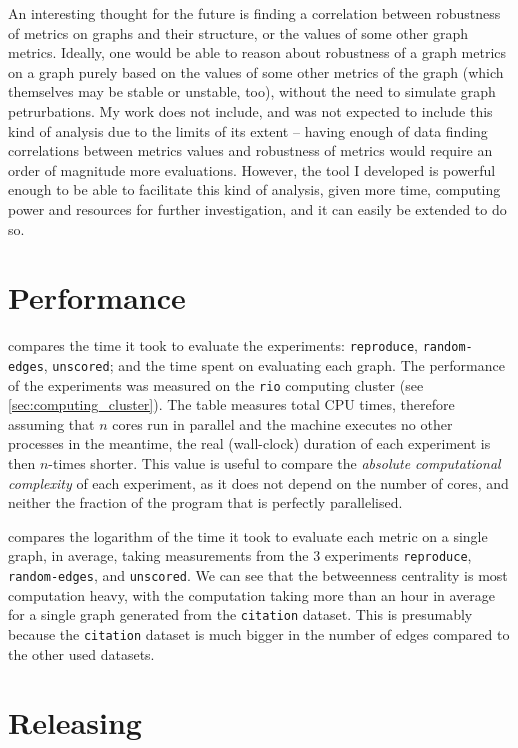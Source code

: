 An interesting thought for the future is finding a correlation between robustness of metrics on graphs and their structure, or the values of some other graph metrics.
Ideally, one would be able to reason about robustness of a graph metrics on a graph purely based on the values of some other metrics of the graph (which themselves may be stable or unstable, too), without the need to simulate graph petrurbations.
My work does not include, and was not expected to include this kind of analysis due to the limits of its extent -- having enough of data finding correlations between metrics values and robustness of metrics would require an order of magnitude more evaluations.
However, the \graffs tool I developed is powerful enough to be able to facilitate this kind of analysis, given more time, computing power and resources for further investigation, and it can easily be extended to do so.


\section{Performance}




 compares the time it took to evaluate the experiments: \texttt{reproduce}, \texttt{random-edges}, \texttt{unscored}; and the time spent on evaluating each graph.
The performance of the experiments was measured on the \texttt{rio} computing cluster (see \autoref{sec:computing_cluster}).
The table measures total CPU times, therefore assuming that $n$ cores run in parallel and the machine executes no other processes in the meantime, the real (wall-clock) duration of each experiment is then $n$-times shorter.
This value is useful to compare the \textsl{absolute computational complexity} of each experiment, as it does not depend on the number of cores, and neither the fraction of the program that is perfectly parallelised.

 compares the logarithm of the time it took to evaluate each metric on a single graph, in average, taking measurements from the 3 experiments \texttt{reproduce}, \texttt{random-edges}, and \texttt{unscored}.
We can see that the betweenness centrality is most computation heavy, with the computation taking more than an hour in average for a single graph generated from the \texttt{citation} dataset.
This is presumably because the \texttt{citation} dataset is much bigger in the number of edges compared to the other used datasets.


\section{Releasing \graffs}

